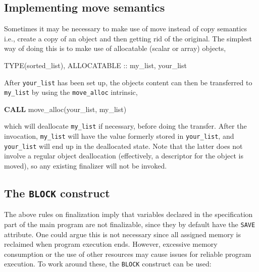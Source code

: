 \documentclass[
]{scrartcl}
\newenvironment{Shaded}{}{}
\newcommand{\DataTypeTok}[1]{\textcolor[rgb]{0.56,0.13,0.00}{#1}}
\newcommand{\KeywordTok}[1]{\textcolor[rgb]{0.00,0.44,0.13}{\textbf{#1}}}
\newcommand{\NormalTok}[1]{#1}
\begin{document}
\subsection{Implementing move
semantics}\label{implementing-move-semantics}

Sometimes it may be necessary to make use of move instead of copy
semantics i.e., create a copy of an object and then getting rid of the
original. The simplest way of doing this is to make use of allocatable
(scalar or array) objects,

\begin{Shaded}
\begin{Highlighting}[]
\DataTypeTok{TYPE(sorted\_list)}\NormalTok{, }\DataTypeTok{ALLOCATABLE} \DataTypeTok{::}\NormalTok{ my\_list, your\_list}
\end{Highlighting}
\end{Shaded}

After \texttt{your\_list} has been set up, the object\textquotesingle s
content can then be transferred to \texttt{my\_list} by using the
\texttt{move\_alloc} intrinsic,

\begin{Shaded}
\begin{Highlighting}[]
\KeywordTok{CALL}\NormalTok{ move\_alloc(your\_list, my\_list)}
\end{Highlighting}
\end{Shaded}

which will deallocate \texttt{my\_list} if necessary, before doing the
transfer. After the invocation, \texttt{my\_list} will have the value
formerly stored in \texttt{your\_list}, and \texttt{your\_list} will end
up in the deallocated state. Note that the latter does not involve a
regular object deallocation (effectively, a descriptor for the object is
moved), so any existing finalizer will not be invoked.

\subsection{\texorpdfstring{The \texttt{BLOCK}
construct}{The BLOCK construct}}\label{the-block-construct}

The above rules on finalization imply that variables declared in the
specification part of the main program are not finalizable, since they
by default have the \texttt{SAVE} attribute. One could argue this is not
necessary since all assigned memory is reclaimed when program execution
ends. However, excessive memory consumption or the use of other
resources may cause issues for reliable program execution. To work
around these, the \texttt{BLOCK} construct can be used:
\end{document}
